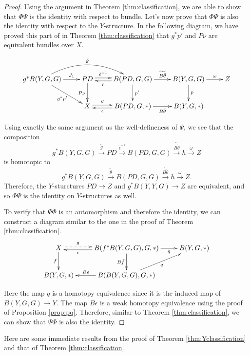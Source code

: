 \documentclass[psamsfonts]{amsart}
\theoremstyle{definition}
\theoremstyle{remark}
\numberwithin{equation}{section}
\begin{document}
\begin{proof}
Using the argument in Theorem \ref{thm:classification}, we are able to show that $\Phi\Psi$ is the identity with respect to bundle. Let's now prove that $\Phi\Psi$ is also the identity with respect to the $Y$-structure. In the following diagram, we have proved this part of in Theorem \ref{thm:classification} that $g^{*}p'$ and $P\nu$ are equivalent bundles over $X$. 

\[\xymatrix{
g^{*}B(Y, G, G) \ar[dr]_-{g^{*}p'} \ar[r]^-{J_{1}} \ar@/^5ex/[rr]^-{\tilde{g}} & PD \ar[d]_{P\nu} \ar[r]<0.5ex>^-{\tilde{\epsilon}^{-1}} & B(PD, G, G) \ar[d]^{p'} \ar[l]<0.5ex>^-{\tilde{\epsilon}} \ar[r]^-{\widetilde{B\tilde{\theta}}}& B(Y, G, G) \ar[d]^-{p} \ar[r]^-{\omega} & Z\\
& X \ar[r]<0.5ex>^-{g} & B(PD, G, *) \ar[l]<0.5ex>^-{\epsilon} \ar[r]_-{B\tilde{\theta}} & B(Y, G, *) \\} \]

Using exactly the same argument as the well-defineness of $\Psi$, we see that the composition $$g^{*}B(Y, G, G) \xrightarrow{\tilde{g}} PD \xrightarrow{\tilde{\epsilon}^{-1}}  B(PD, G, G) \xrightarrow{\widetilde{B\tilde{\theta}}} h \xrightarrow{\omega} Z $$ is homotopic to $$g^{*}B(Y, G, G) \xrightarrow{\tilde{g}}  B(PD, G, G) \xrightarrow{\widetilde{B\tilde{\theta}}} h \xrightarrow{\omega} Z.$$ Therefore, the $Y$-sturctures $PD \to Z$ and $g^{*}{B(Y, Y, G)} \to Z$ are equivalent, and so $\Phi\Psi$ is the identity on $Y$-structures as well.







To verify that $\Psi\Phi$ is an automorphism and therefore the identity, we can construct a diagram similar to the one in the proof of Theorem \ref{thm:classification}.
\[\xymatrix{
X \ar@{.>}[r]<.5ex>^-{g} \ar[d]_-{f} & B(f^{*}B(Y, G, G), G, *) \ar[l]<.5ex>^-{\epsilon}  \ar[d]_-{B\tilde{f}} \ar[r]_-{q} & B(Y, G, *)\\
B(Y, G, *) & B(B(Y, G, G), G, *) \ar[l]_-{B\epsilon} \ar[ur]_-{q}\\
} \]

Here the map $q$ is a homotopy equivalence since it is the induced map of $B(Y, G, G) \to Y$. The map $B\epsilon$ is a weak homotopy equivalence using the proof of Proposition \ref{prop:pq}. Therefore, similar to Theorem \ref{thm:classification}, we can show that $\Psi\Phi$ is also the identity.
\end{proof}

Here are some immediate results from the proof of Theorem \ref{thm:Yclassification} and that of Theorem \ref{thm:classification}.
\end{document}

